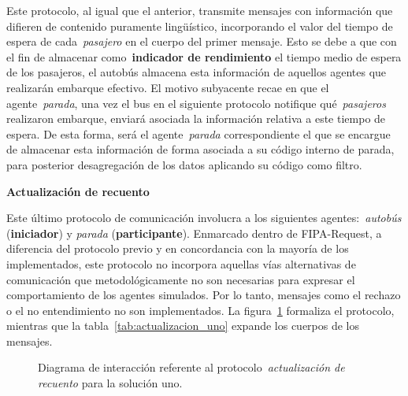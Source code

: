 Este protocolo, al igual que el anterior, transmite mensajes con información que difieren de contenido puramente lingüístico, incorporando
el valor del tiempo de espera de cada~\textit{pasajero} en el cuerpo del primer mensaje. Esto se debe a que con el fin de almacenar
como~\textbf{indicador de rendimiento} el tiempo medio de espera de los pasajeros, el autobús almacena esta información de aquellos
agentes que realizarán embarque efectivo. El motivo subyacente recae en que el agente~\textit{parada}, una vez el bus en el siguiente
protocolo notifique qué~\textit{pasajeros} realizaron embarque, enviará asociada la información relativa a este tiempo de espera.
De esta forma, será el agente~\textit{parada} correspondiente el que se encargue de almacenar esta información de forma asociada
a su código interno de parada, para posterior desagregación de los datos aplicando su código como filtro.


\medskip
\noindent\textbf{Actualización de recuento}

Este último protocolo de comunicación involucra a los siguientes agentes:~\textit{autobús} (\textbf{iniciador}) y \textit{parada}
(\textbf{participante}). Enmarcado dentro de FIPA-Request, a diferencia del protocolo previo y en concordancia con la mayoría 
de los implementados, este protocolo no incorpora aquellas vías alternativas de comunicación que metodológicamente no son necesarias
para expresar el comportamiento de los agentes simulados. Por lo tanto, mensajes como el rechazo o el no entendimiento no son 
implementados. La figura~\ref{fig:actualizacion_uno} formaliza el protocolo, mientras que la tabla~\ref{tab:actualizacion_uno}
expande los cuerpos de los mensajes.


\begin{figure}[H]
 \centering
    
\caption{Diagrama de interacción referente al protocolo~\textit{actualización de recuento} para la solución uno.}
\par\vspace{4pt}{\footnotesize Fuente: elaboración propia.}\label{fig:actualizacion_uno}
\end{figure}


